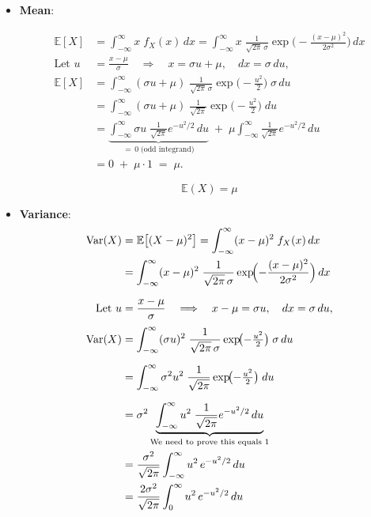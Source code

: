 \documentclass[twoside]{book}
\begin{document}
\begin{itemize}
    \item \textbf{Mean}:

    \begin{align*}
    \mathbb{E}[X]
    &= \int_{-\infty}^{\infty} x \; f_X(x)\,dx
    = \int_{-\infty}^{\infty} x \;\frac{1}{\sqrt{2\pi}\,\sigma}
    \exp\!\biggl(-\frac{(x-\mu)^2}{2\sigma^2}\biggr)\,dx \\[6pt]
    \text{Let } u &= \frac{x - \mu}{\sigma}
    \quad\Longrightarrow\quad
    x = \sigma u + \mu,
    \quad dx = \sigma\,du, \\[3pt]
    \mathbb{E}[X] &= \int_{-\infty}^{\infty}
    (\sigma u + \mu)\;
    \frac{1}{\sqrt{2\pi}\,\sigma}
    \exp\!\bigl(-\tfrac{u^2}{2}\bigr)\;\sigma\,du \\[6pt]
    &= \int_{-\infty}^{\infty}
    (\sigma u + \mu)\;
    \frac{1}{\sqrt{2\pi}}
    \exp\!\bigl(-\tfrac{u^2}{2}\bigr)\;du \\[6pt]
    &= \underbrace{\int_{-\infty}^{\infty}
    \sigma u \;\frac{1}{\sqrt{2\pi}}
    e^{-u^2/2}\,du}_{=\,0\;\text{(odd integrand)}}
    \;+\;
    \mu \int_{-\infty}^{\infty}
    \frac{1}{\sqrt{2\pi}}
    e^{-u^2/2}\,du \\[6pt]
    &= 0 \;+\; \mu \cdot 1
    \;=\; \mu.
    \end{align*}

    \begin{textbox}
        \[
        \mathbb{E}(X) = \mu
        \]
        \end{textbox}


    \item \textbf{Variance}:
    \begin{align*}
    \operatorname{Var}(X)
    &= \mathbb{E}\bigl[(X - \mu)^2\bigr]
    = \int_{-\infty}^{\infty} (x - \mu)^2 \; f_X(x)\,dx \\
    &= \int_{-\infty}^{\infty} (x - \mu)^2 \;\frac{1}{\sqrt{2\pi}\,\sigma}
    \exp\!\Bigl(-\frac{(x-\mu)^2}{2\sigma^2}\Bigr)\,dx \\[6pt]
    \text{Let } u &= \frac{x - \mu}{\sigma}
    \quad\Longrightarrow\quad
    x - \mu = \sigma u,
    \quad dx = \sigma\,du, \\[3pt]
    \operatorname{Var}(X)&= \int_{-\infty}^{\infty}
    (\sigma u)^2 \;
    \frac{1}{\sqrt{2\pi}\,\sigma}
    \exp\!\bigl(-\tfrac{u^2}{2}\bigr)\;\sigma\,du \\[6pt]
    &= \int_{-\infty}^{\infty}
    \sigma^2 u^2 \;
    \frac{1}{\sqrt{2\pi}}
    \exp\!\bigl(-\tfrac{u^2}{2}\bigr)\;du \\[6pt]
    &= \sigma^2 \underbrace{\int_{-\infty}^{\infty}
            u^2 \;\frac{1}{\sqrt{2\pi}} e^{-u^2/2}\,du}_{\text{We need to prove this equals 1}}\\
    &= \frac{\sigma^2}{\sqrt{2\pi}} \int_{-\infty}^{\infty} u^2\,e^{-u^2/2}\,du\\
    &= \frac{2\sigma^2}{\sqrt{2\pi}} \int_{0}^{\infty} u^2\,e^{-u^2/2}\,du\
    \end{align*}


\end{itemize}
\end{document}
